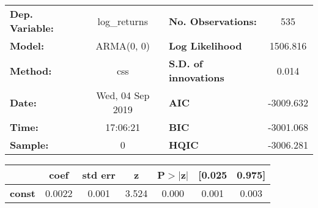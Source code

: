 \begin{center}
\begin{tabular}{lclc}
\toprule
\textbf{Dep. Variable:} &   log\_returns   & \textbf{  No. Observations:  } &    535      \\
\textbf{Model:}         &    ARMA(0, 0)    & \textbf{  Log Likelihood     } &  1506.816   \\
\textbf{Method:}        &       css        & \textbf{  S.D. of innovations} &   0.014     \\
\textbf{Date:}          & Wed, 04 Sep 2019 & \textbf{  AIC                } & -3009.632   \\
\textbf{Time:}          &     17:06:21     & \textbf{  BIC                } & -3001.068   \\
\textbf{Sample:}        &        0         & \textbf{  HQIC               } & -3006.281   \\
\bottomrule
\end{tabular}
\begin{tabular}{lcccccc}
               & \textbf{coef} & \textbf{std err} & \textbf{z} & \textbf{P$> |$z$|$} & \textbf{[0.025} & \textbf{0.975]}  \\
\midrule
\textbf{const} &       0.0022  &        0.001     &     3.524  &         0.000        &        0.001    &        0.003     \\
\bottomrule
\end{tabular}
\end{center}
